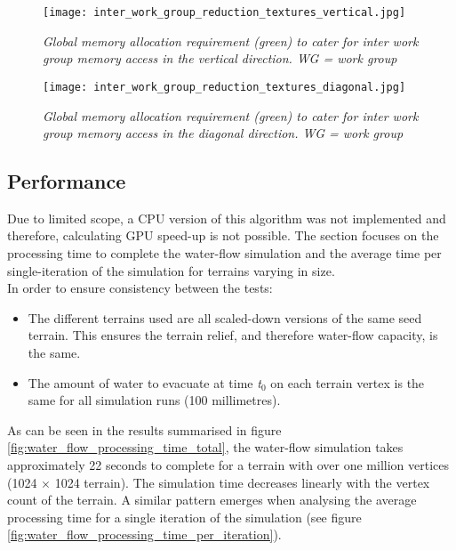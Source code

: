 \begin{figure}
\center
	\texttt{[image: inter\_work\_group\_reduction\_textures\_vertical.jpg]}
	\caption{ \textit{Global memory allocation requirement (green) to cater for inter work group memory access in the vertical direction. \textit{WG} = work group}}
	\label{fig:water_flow_inter_wg_reduc_vert}
\end{figure}

\begin{figure}
\center
	\texttt{[image: inter\_work\_group\_reduction\_textures\_diagonal.jpg]}
	\caption{ \textit{Global memory allocation requirement (green) to cater for inter work group memory access in the diagonal direction. \textit{WG} = work group}}
	\label{fig:water_flow_inter_wg_reduc_diag}
\end{figure}

\subsection{Performance}

Due to limited scope, a CPU version of this algorithm was not implemented and therefore, calculating GPU speed-up is not possible. The section focuses on the processing time to complete the water-flow simulation and the average time per single-iteration of the simulation for terrains varying in size. \\
In order to ensure consistency between the tests:
\begin{itemize}
\item The different terrains used are all scaled-down versions of the same seed terrain. This ensures the terrain relief, and therefore water-flow capacity, is the same.\\
\item The amount of water to evacuate at time \textit{t$_{0}$} on each terrain vertex is the same for all simulation runs (100 millimetres). \\
\end{itemize}

As can be seen in the results summarised in figure \ref{fig:water_flow_processing_time_total}, the water-flow simulation takes approximately 22 seconds to complete for a terrain with over one million vertices (1024 $\times$ 1024 terrain). The simulation time decreases linearly with the vertex count of the terrain. A similar pattern emerges when analysing the average processing time for a single iteration of the simulation (see figure \ref{fig:water_flow_processing_time_per_iteration}).

